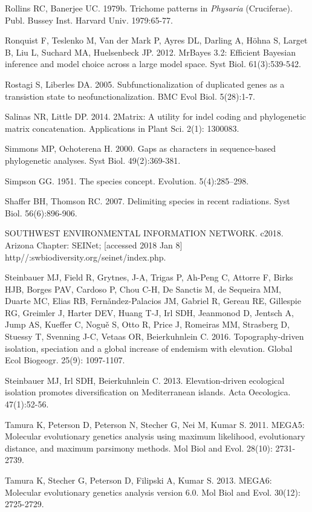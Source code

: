 Rollins RC, Banerjee UC. 1979b. Trichome patterns in \textit{Physaria} (Cruciferae). Publ. Bussey Inst. Harvard Univ. 1979:65-77.

Ronquist F, Teslenko M, Van der Mark P, Ayres DL, Darling A, Höhna S, Larget B, Liu L, Suchard MA, Huelsenbeck JP. 2012. MrBayes 3.2: Efficient Bayesian inference and model choice across a large model space. Syst Biol. 61(3):539-542.

Rostagi S, Liberles DA. 2005. Subfunctionalization of duplicated genes as a transistion state to neofunctionalization. BMC Evol Biol. 5(28):1-7.

Salinas NR, Little DP. 2014. 2Matrix: A utility for indel coding and phylogenetic matrix concatenation. Applications in Plant Sci. 2(1): 1300083.

Simmons MP, Ochoterena H. 2000. Gaps as characters in sequence-based phylogenetic analyses. Syst Biol. 49(2):369-381.

Simpson GG. 1951. The species concept. Evolution. 5(4):285–298.

Shaffer BH, Thomson RC. 2007. Delimiting species in recent radiations. Syst Biol. 56(6):896-906.

SOUTHWEST ENVIRONMENTAL INFORMATION NETWORK. c2018. Arizona Chapter: SEINet; [accessed 2018 Jan 8] http//:swbiodiversity.org/seinet/index.php.


Steinbauer MJ, Field R, Grytnes, J-A, Trigas P, Ah-Peng C, Attorre F, Birks HJB, Borges PAV, Cardoso P, Chou C-H, De Sanctis M, de Sequeira MM,  Duarte MC, Elias RB, Fern\v{a}ndez-Palacios JM, Gabriel R, Gereau RE, Gillespie RG, Greimler J, Harter DEV, Huang T-J, Irl SDH, Jeanmonod D, Jentsch A, Jump AS, Kueffer C, Nogu\v{e} S, Otto R, Price J, Romeiras MM, Strasberg D, Stuessy T, Svenning J-C, Vetaas OR, Beierkuhnlein C. 2016. Topography-driven isolation, speciation and a global increase of endemism with elevation. Global Ecol Biogeogr. 25(9): 1097-1107.

Steinbauer MJ, Irl SDH, Beierkuhnlein C. 2013. Elevation-driven ecological isolation promotes diversification on Mediterranean islands. Acta Oecologica. 47(1):52-56.


Tamura K, Peterson D, Peterson N, Stecher G, Nei M, Kumar S. 2011. MEGA5: Molecular evolutionary genetics analysis using maximum likelihood, evolutionary distance, and maximum parsimony methods. Mol Biol and Evol. 28(10): 2731-2739.

Tamura K, Stecher G, Peterson D, Filipski A, Kumar S. 2013. MEGA6: Molecular evolutionary genetics analysis version 6.0. Mol Biol and Evol. 30(12): 2725-2729.

